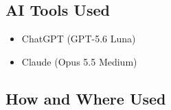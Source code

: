 \documentclass{article}
\begin{document}


\subsection{AI Tools Used}


\begin{itemize}
    \item ChatGPT (GPT-5.6 Luna)
    \item Claude (Opus 5.5 Medium)
\end{itemize}

\subsection{How and Where Used}



\end{document}
